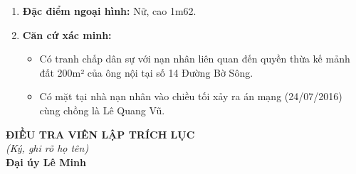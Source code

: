 \documentclass[12pt,a4paper]{article}
\begin{document}
\begin{enumerate}[label=\arabic*., leftmargin=*, itemsep=2pt, topsep=2pt, parsep=0pt]
  \item \textbf{Đặc điểm ngoại hình:} Nữ, cao 1m62.
  \item \textbf{Căn cứ xác minh:}
\begin{itemize}[leftmargin=*, itemsep=2pt, topsep=2pt, parsep=0pt]
  \item Có tranh chấp dân sự với nạn nhân liên quan đến quyền thừa kế mảnh đất 200m² của ông nội tại số 14 Đường Bờ Sông.
  \item Có mặt tại nhà nạn nhân vào chiều tối xảy ra án mạng (24/07/2016) cùng chồng là Lê Quang Vũ.
\end{itemize}
\end{enumerate}
\vspace{0.8cm}
\noindent
\hfill
\begin{minipage}[t]{0.50\textwidth}
    \begin{center}
        \textbf{ĐIỀU TRA VIÊN LẬP TRÍCH LỤC}\\[0.1cm]
        \textit{(Ký, ghi rõ họ tên)}\\[1.6cm]
        \textbf{Đại úy Lê Minh}
    \end{center}
\end{minipage}
\end{document}

